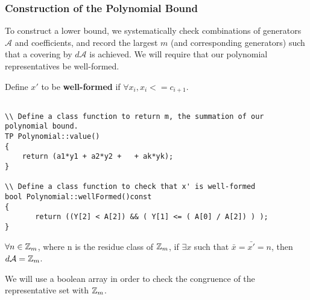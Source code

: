 \subsubsection{Construction of the Polynomial Bound}

To construct a lower bound, we systematically check combinations of generators $\mathcal{A}$ and coefficients, and record the largest $m$ (and corresponding generators) such that a covering by $d \mathcal{A}$ is achieved.\n
We will require that our polynomial representatives be well-formed.

\begin{proposition}
Define $x'$ to be \textbf{well-formed} if $\forall x_i, x_i <= c_{i+1}$.  
\end{proposition}

\begin{lstlisting}

\\ Define a class function to return m, the summation of our polynomial bound.
TP Polynomial::value()
{
    return (a1*y1 + a2*y2 +   + ak*yk);
}

\\ Define a class function to check that x' is well-formed
bool Polynomial::wellFormed()const
{
       return ((Y[2] < A[2]) && ( Y[1] <= ( A[0] / A[2]) ) );
}

\end{lstlisting}

\begin{proposition}
$\forall n \in \mbox{$\mathbb Z$}_m$, where n is the residue class of $\mbox{$\mathbb Z$}_m$, if $\exists  x$ such that $\bar{x} = \bar{x'}= n$, then $d \mathcal{A} = \mbox{$\mathbb Z$}_m$.\n
\end{proposition}

\noindent
We will use a boolean array in order to check the congruence of the representative set with $\mbox{$\mathbb Z$}_m$.

